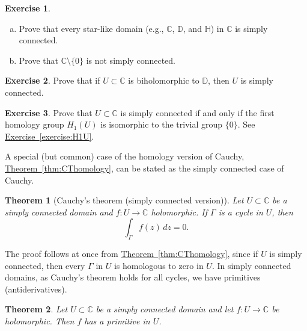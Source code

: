 \documentclass[12pt,openany]{book}
\newcommand{\C}{{\mathbb{C}}}
\newcommand{\D}{{\mathbb{D}}}
\newcommand{\bH}{{\mathbb{H}}}
\theoremstyle{plain}
\newtheorem{thm}{Theorem}[section]
\theoremstyle{remark}
\theoremstyle{definition}
\newenvironment{exbox}{%
    \def\FrameCommand{\vrule width 1pt \relax\hspace{10pt}}%
    \MakeFramed{\advance\hsize-\width\FrameRestore}%
}{%
    \endMakeFramed
}
\newenvironment{exparts}{%
    \leavevmode\begin{enumerate}[a),noitemsep,topsep=0pt,parsep=0pt,partopsep=0pt]
}{%
    \end{enumerate}
}
\theoremstyle{exercise}
\newtheorem{exercise}{Exercise}[section]
\theoremstyle{example}
\newcommand{\exerciseref}[1]{\hyperref[#1]{Exercise~\ref*{#1}}}
\newcommand{\thmref}[1]{\hyperref[#1]{Theorem~\ref*{#1}}}
\begin{document}
\begin{exbox}
\begin{exercise}
\begin{exparts}
\item
Prove that every star-like domain (e.g., $\C$, $\D$, and $\bH$) in $\C$ is simply connected.
\item
Prove that $\C \setminus \{ 0 \}$ is not simply connected.
\end{exparts}
\end{exercise}

\begin{exercise}
Prove that if $U \subset \C$ is biholomorphic to $\D$, then $U$
is simply connected.
\end{exercise}

\begin{exercise}
Prove that $U \subset \C$ is simply connected if and only if
the first homology group
$H_1(U)$ is isomorphic to the trivial group $\{ 0 \}$.
See \exerciseref{exercise:H1U}.
\end{exercise}
\end{exbox}

A special (but common) case of the homology version of Cauchy,
\thmref{thm:CThomology}, can be stated as the simply connected case of Cauchy.

\begin{thm}[Cauchy's theorem (simply connected version)]
%
Let $U \subset \C$ be a simply connected domain and $f \colon U \to \C$
holomorphic.  If $\Gamma$ is a cycle in $U$, then
\begin{equation*}
\int_\Gamma f(z) \, dz = 0 .
\end{equation*}
\end{thm}

The proof follows at once from \thmref{thm:CThomology},
since if $U$ is simply connected, then
every $\Gamma$ in $U$ is homologous to zero in $U$.
In simply connected domains,
as Cauchy's theorem holds for all cycles,
we have primitives (antiderivatives).

\begin{thm}
Let $U \subset \C$ be a simply connected domain and
let $f \colon U \to \C$ be holomorphic.  Then $f$ has a
primitive in $U$.
\end{thm}
\end{document}

